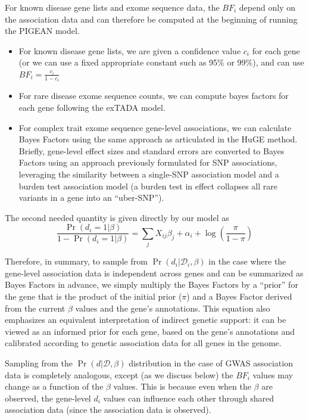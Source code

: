\documentclass[11pt]{article}
\begin{document}
For known disease gene lists and exome sequence data, the $BF_i$
depend only on the association data and can therefore be computed at
the beginning of running the PIGEAN model.
\begin{itemize}
\item For known disease gene lists, we are given a confidence value
  $c_i$ for each gene (or we can use a fixed appropriate constant such as
  95\% or 99\%), and can use $BF_i = \frac{c_i}{1-c_i}$
\item For rare disease exome sequence counts, we can compute bayes
  factors for each gene following the exTADA model\cite{}.
\item For complex trait exome sequence gene-level associations, we
    can calculate Bayes Factors using the same approach as articulated
    in the HuGE method\cite{}. Briefly, gene-level effect sizes and
    standard errors are converted to Bayes Factors using an approach
    previously formulated for SNP associations, leveraging the
    similarity between a single-SNP association model and a burden
    test association model (a burden test in effect collapses all rare
    variants in a gene into an ``uber-SNP'').
\end{itemize}

The second needed quantity is given directly by our model as
\begin{equation}\frac{\Pr\left(d_i=1|\beta\right)}{1-\Pr\left(d_i=1|\beta\right)} = \sum_jX_{ij}\beta_j + \alpha_i +
\log\left(\frac{\pi}{1-\pi}\right)\label{eq:prior}
\end{equation}

Therefore, in summary, to sample from
$\Pr\left(d_i|\mathcal{D}_i,\beta\right)$ in the case where the
gene-level association data is independent across genes and can be
summarized as Bayes Factors in advance, we simply multiply the Bayes
Factors by a ``prior'' for the gene that is the product of the initial
prior ($\pi$) and a Bayes Factor derived from the current $\beta$
values and the gene's annotations. This equation also emphasizes an
equivalent interpretation of indirect genetic support: it can be
viewed as an informed prior for each gene, based on the gene's
annotations and calibrated according to genetic association data for
all genes in the genome.

Sampling from the
$\Pr\left(d|\mathcal{D},\beta\right)$ distribution
in the case of GWAS association data is completely analogous, except
(as we discuss below) the $BF_i$ values may change as a function of
the $\beta$ values. This is because even when the $\beta$ are
observed, the gene-level $d_i$ values can influence each other through
shared association data (since the association data is observed).
\end{document}
